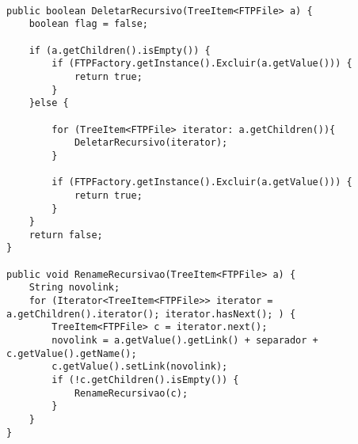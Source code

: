 \documentclass[12pt]{article}
\begin{document}
\begin{lstlisting}

public boolean DeletarRecursivo(TreeItem<FTPFile> a) {
	boolean flag = false;
	
	if (a.getChildren().isEmpty()) {
		if (FTPFactory.getInstance().Excluir(a.getValue())) {
			return true;
		}
	}else {
	
		for (TreeItem<FTPFile> iterator: a.getChildren()){
			DeletarRecursivo(iterator);
		}
		
		if (FTPFactory.getInstance().Excluir(a.getValue())) {
			return true;
		}
	}
	return false;
}

public void RenameRecursivao(TreeItem<FTPFile> a) {
	String novolink;
	for (Iterator<TreeItem<FTPFile>> iterator = a.getChildren().iterator(); iterator.hasNext(); ) {
		TreeItem<FTPFile> c = iterator.next();
		novolink = a.getValue().getLink() + separador + c.getValue().getName();
		c.getValue().setLink(novolink);
		if (!c.getChildren().isEmpty()) {
			RenameRecursivao(c);
		}
	}
}
\end{lstlisting}
\end{document}
